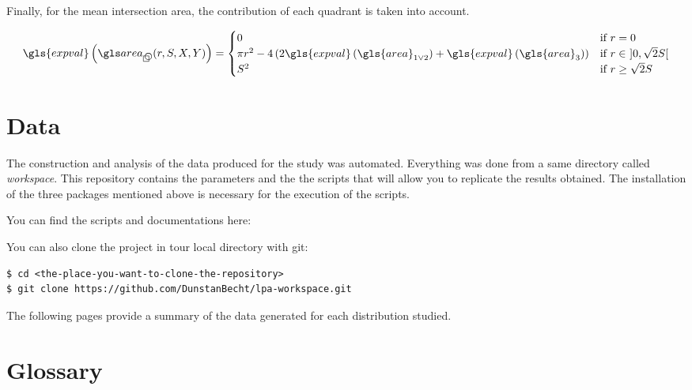 \begin{appendix}
\medskip

Finally, for the mean intersection area, the contribution of each quadrant is taken into account.

\begin{equation}\label{eq:mean-circle-square-intersection}
\gls{expval} \left( \cirsqr (r, S, X, Y) \right) =
\begin{cases}
0 &\text{if } r = 0 \\
\pi r^2 - 4 \left(2 \gls{expval} \left( \gls{area}_{1 \lor 2} \right) +\gls{expval} \left( \gls{area}_{3} \right)\right) &\text{if } r \in \ ] 0, \sqrt{2} S [ \\
S^2 &\text{if } r \geq \sqrt{2} S
\end{cases}
\end{equation}


\section{Data}\label{sec:data}

The construction and analysis of the data produced for the study was automated.
Everything was done from a same directory called \textit{workspace}.
This repository contains the parameters and the the scripts that will allow you to replicate the results obtained.
The installation of the three packages mentioned above is necessary for the execution of the scripts.

\bigskip

You can find the scripts and documentations here: 

\bigskip

You can also clone the project in tour local directory with git:

\begin{tcolorbox}[width=\linewidth, title=shell]
\begin{verbatim}
$ cd <the-place-you-want-to-clone-the-repository>
$ git clone https://github.com/DunstanBecht/lpa-workspace.git
\end{verbatim}
\end{tcolorbox}

\bigskip

The following pages provide a summary of the data generated for each distribution studied.

\newpage

\begin{multicols}{2}



\null

\end{multicols}

\section{Glossary}

\printnoidxglossaries

\printbibliography[heading=bibintoc, heading=bibnumbered]

\end{appendix}
